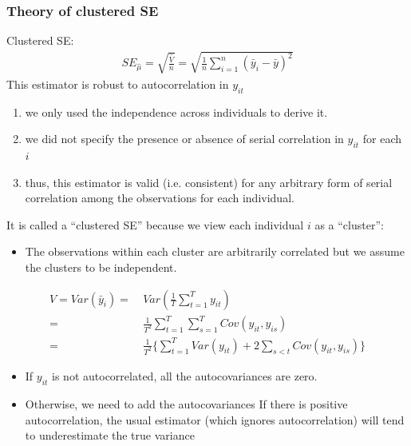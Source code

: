 \documentclass[a4paper,twoside,11pt]{article}
\begin{document}
\subsubsection{Theory of clustered SE}
Clustered SE:
\begin{equation*}
\begin{aligned}
SE_{\hat{\mu}} = \sqrt{\frac{\hat{V}}{n}} = \sqrt{\frac{1}{n} \sum^n_{i=1} (\bar y_i - \bar y)^2 }
\end{aligned} 
\end{equation*}
This estimator is robust to autocorrelation in $y_{it}$
\begin{enumerate}
    \item \textcolor{NavyBlue}{we only used the independence across individuals to derive it.}
    \item we did not specify the presence or absence of serial correlation in $y_{it}$ for each $i$ 
    \item thus, this estimator is valid (i.e. consistent) for any arbitrary form of serial correlation among the observations for each individual.
\end{enumerate}
It is called a “clustered SE” because we view each individual $i$ as a “cluster”:
\begin{itemize}
    \item The observations within each cluster are arbitrarily correlated but we assume the clusters to be independent.
\end{itemize}
\begin{equation*}
\begin{aligned}
V = Var(\bar y_i ) =& \  Var(\frac{1}{T} \sum^T_{t=1} y_{it} ) \\
=& \ \frac{1}{T^2} \sum^T_{t=1} \sum^T_{s=1} Cov(y_{it}, y_{is}) \\
=& \ \frac{1}{T^2} \{ \sum^T_{t=1} Var(y_{it}) + 2 \sum_{s < t} Cov(y_{it}, y_{is}) \}
\end{aligned} 
\end{equation*}
\begin{itemize}
    \item If $y_{it}$ is not autocorrelated, all the autocovariances are zero.
    \item Otherwise, we need to add the autocovariances
    \newline
    If there is positive autocorrelation, the usual estimator (which ignores autocorrelation) will tend to underestimate the true variance
\end{itemize}
\end{document}
